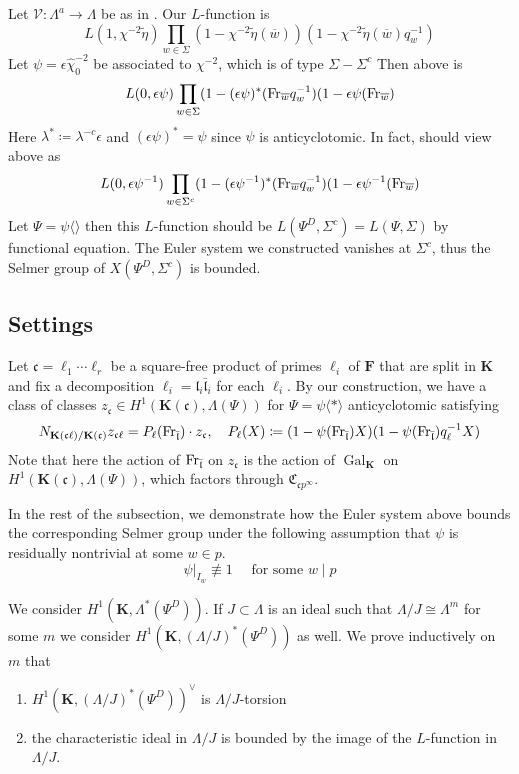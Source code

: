 \documentclass[leqno]{amsart}
\newcommand{\bw}{\overline{w}}
\newcommand{\flw}{\bar{\fl}}
\newcommand{\Fr}{\textnormal{Fr}} %
\DeclareMathOperator{\Gal}{Gal}
\newcommand{\F}{{\mathbf{F}}} %
\newcommand{\K}{{\mathbf{K}}} %
\newcommand{\rp}[1]{\mathfrak{C}_{#1}} %
\newcommand{\rk}[1]{\K({#1})} %
\newcommand{\fc}{\mathfrak{c}}
\newcommand{\fl}{\mathfrak{l}}
\theoremstyle{definition}
\theoremstyle{remark}
\begin{document}
Let $\mathscr{V}\colon \Lambda^a\to \Lambda$
be as in \cite{HT94}.
Our $L$-function is
\[
L(1,\chi^{-2}\tilde{\eta})\prod_{w\in\Sigma}
(1-\chi^{-2}\tilde{\eta}(\bw))
(1-\chi^{-2}\tilde{\eta}(\bw)q_w^{-1})
\]
Let $\psi=\epsilon\hat{\chi}_0^{-2}$ be associated to 
$\chi^{-2}$, which is of type $\Sigma-\Sigma^c$
Then above is 
\[
	L(0,\epsilon\psi)\prod_{w\in \Sigma}
	(1-(\epsilon\psi)^*(\Fr_{\bw}q_w^{-1})
	(1-\epsilon\psi(\Fr_{\bw})
\]
Here  $\lambda^*\coloneqq \lambda^{-c}\epsilon$ 
and $(\epsilon\psi)^*=\psi$ since  $\psi$
is anticyclotomic.
In fact, should view above as
\[
	L(0,\epsilon\psi^{-1})\prod_{w\in\Sigma^c}
	(1-(\epsilon\psi^{-1})^*(\Fr_{\bw}q_w^{-1})
	(1-\epsilon\psi^{-1}(\Fr_{\bw})
\]
Let $\Psi=\psi\langle\rangle$
then this  $L$-function
should be $L(\Psi^D,\Sigma^c)=L(\Psi,\Sigma)$
by functional equation.
The Euler system we constructed vanishes at  $\Sigma^c$,
thus the Selmer group of  $X(\Psi^D,\Sigma^c)$
is bounded. 


\cite{Och05}
\cite{Och08}
\cite{Hsieh2010}
\cite{HT93}
\cite{Hida06}
\cite{Hida06b}
\cite{Rubin}

\subsection{Settings}

Let $\fc=\ell_1\cdots\ell_r$
be a square-free product
of primes $\ell_i$ of  $\F$
that are split in  $\K$
and fix a decomposition
$\ell_i=\fl_i\flw_i$
for each  $\ell_i$.
By our construction, we have 
a class of classes
$z_\fc\in H^1(\rk{\fc},\Lambda(\Psi))$
for  $\Psi=\psi\langle*\rangle$ anticyclotomic 
satisfying 
\[
	N_{\rk{\fc\ell}/\rk{\fc}}z_{\fc\ell}=
	P_\ell(\Fr_{\bar{\fl}})\cdot z_\fc,\quad
	P_\ell(X)\coloneqq(1-\psi(\Fr_{\flw})X)
	(1-\psi(\Fr_{\flw})q_\ell^{-1}X)
\]
Note that here the action of $\Fr_{\flw}$
on $z_{\fc}$ is the action of $\Gal_\K$
on  $H^1(\rk{\fc},\Lambda(\Psi))$,
which factors through  $\rp{\fc p^\infty}$.

In the rest of the subsection,
we demonstrate how the Euler system above
bounds the corresponding Selmer group 
under the following assumption
that $\psi$ is residually nontrivial
at some $w\in p$.
\begin{equation}\label{cond:distinct}\tag{dist}
	\psi\vert_{I_w}\not\equiv1\quad
	\text{ for some } w\mid p
\end{equation}

We consider $H^1(\K, \Lambda^*(\Psi^D))$. 
If  $J\subset \Lambda$ is an ideal 
such that  $\Lambda/J\cong \Lambda^{m}$ for some $m$
we consider  $H^1(\K,(\Lambda/J)^*(\Psi^D))$ as well.
We prove inductively on  $m$ that 
\begin{enumerate}[label=(\alph*)]
	\item $H^1(\K,(\Lambda/J)^*(\Psi^D))^\vee$ is $\Lambda/J$-torsion
	\item the characteristic ideal in $\Lambda/J$
		is bounded by the image of the $L$-function in $\Lambda/J$.
\end{enumerate}
\end{document}
